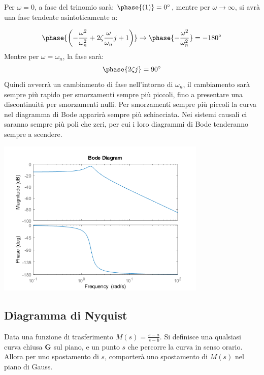 \documentclass{article}
\numberwithin{equation}{subsection}
\begin{document}
Per $\omega=0$, a fase del trinomio sarà: $\phase{(1)}=0^{\circ}$, mentre per $\omega\to\infty$, si avrà una fase tendente asintoticamente a: 

\begin{equation}
    \phase{\left(-\displaystyle\frac{\omega^2}{\omega_n^2}+2\zeta\frac{\omega}{\omega_n}j+1\right)}\to\phase{-\displaystyle\frac{\omega^2}{\omega_n^2}}=-180^{\circ}
\end{equation}
Mentre per $\omega=\omega_n$, la fase sarà: 
\begin{equation}
    \phase{2\zeta j}=90^{\circ}
\end{equation}
Quindi avverrà un cambiamento di fase nell'intorno di $\omega_n$, il cambiamento sarà sempre più rapido per smorzamenti sempre più piccoli, fino a presentare una 
discontinuità per smorzamenti nulli. Per smorzamenti sempre più piccoli la curva nel diagramma di Bode apparirà sempre più schiacciata. 
Nei sistemi causali ci saranno sempre più poli che zeri, per cui i loro diagrammi di Bode tenderanno sempre a scendere. \\

\begin{center}
    \includegraphics[width=10cm]{BodeRisonanza}
\end{center}

\subsection{Diagramma di Nyquist}
Data una funzione di trasferimento $M(s)=\displaystyle\frac{s-a}{s-b}$. Si definisce una qualsiasi curva chiusa $\mathbf{G}$ sul piano, e un punto $s$ che percorre la curva in senso 
orario. Allora per uno spostamento di $s$, comporterà uno spostamento di $M(s)$ nel piano di Gauss. 
\end{document}
